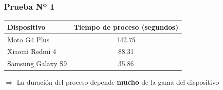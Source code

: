 \begin{frame}[t,fragile]
\frametitle {Prueba Nº 1}
\vspace{10mm}
\begin{table}[t]
	\begin{center}
		\label{tab:tiempo1}
		\begin{adjustbox}{max width=\textwidth}
			\begin{tabular}{l|c}
				\hline
				\hline
				\textbf{Dispositivo} & \textbf{Tiempo de proceso (segundos)}\\
				\hline
				Moto G4 Plus & 142.75\\
				
				Xiaomi Redmi 4 & 88.31\\
				
				Samsung Galaxy S9 & 35.86\\
				\hline
			\end{tabular}
		\end{adjustbox}
	\end{center}
\end{table}
\vspace{5mm}
\begin{center}
	$\Rightarrow$ La duración del proceso depende \textbf{mucho} de la gama del dispositivo
\end{center}
\end{frame}
